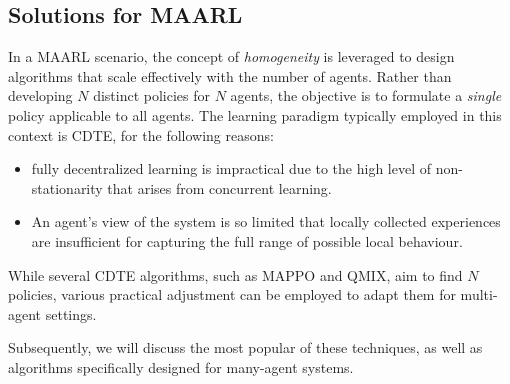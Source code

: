 \subsection{Solutions for \ac{MAARL}}
In a \ac{MAARL} scenario, 
 the concept of \emph{homogeneity} is leveraged to design algorithms that scale effectively with the number of agents. 
 Rather than developing $N$ distinct policies for $N$ agents, 
 the objective is to formulate a \emph{single} policy applicable to all agents.
%
The learning paradigm typically employed in this context is CDTE, for the following reasons:
\begin{itemize}
\item fully decentralized learning is impractical due to the high level of non-stationarity 
 that arises from concurrent learning.
\item An agent's view of the system is so limited that locally 
 collected experiences are insufficient for capturing the full range of possible local behaviour.
\end{itemize}
While several CDTE algorithms, such as MAPPO and QMIX, aim to find $N$ policies, 
 various practical adjustment can be employed to adapt them for multi-agent settings. 

Subsequently, we will discuss the most popular of these techniques, as well as algorithms specifically designed for many-agent systems.
